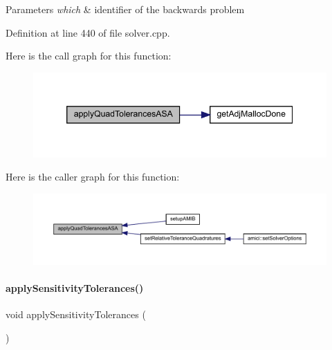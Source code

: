\begin{DoxyParams}{Parameters}
{\em which} & identifier of the backwards problem \\
\hline
\end{DoxyParams}


Definition at line 440 of file solver.\+cpp.

Here is the call graph for this function\+:
\nopagebreak
\begin{figure}[H]
\begin{center}
\leavevmode
\includegraphics[width=346pt]{classamici_1_1_solver_a09d47957ba70f725efb5e3a385a274a6_cgraph}
\end{center}
\end{figure}
Here is the caller graph for this function\+:
\nopagebreak
\begin{figure}[H]
\begin{center}
\leavevmode
\includegraphics[width=350pt]{classamici_1_1_solver_a09d47957ba70f725efb5e3a385a274a6_icgraph}
\end{center}
\end{figure}
\mbox{\label{classamici_1_1_solver_a2d93ff630e5bb38f4bc6d8b47b46bd73}} 
\paragraph{\texorpdfstring{apply\+Sensitivity\+Tolerances()}{applySensitivityTolerances()}}
{\footnotesize\ttfamily void apply\+Sensitivity\+Tolerances (\begin{DoxyParamCaption}{ }\end{DoxyParamCaption})\hspace{0.3cm}{\ttfamily [protected]}}

